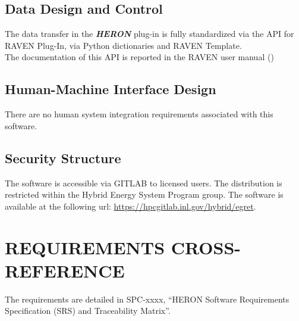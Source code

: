 \subsection{Data Design and Control}
The data transfer in the \textbf{\textit{HERON}}  plug-in is fully standardized via the API for RAVEN Plug-In, via
Python dictionaries and RAVEN Template.
\\The documentation of this  API is reported in the RAVEN user manual (\cite{RAVENuserManual})

\subsection{Human-Machine Interface Design} 
 There are no human system integration requirements associated with this software.

 \subsection{Security Structure} 


The software is accessible via GITLAB to licensed users. The distribution is restricted within the Hybrid Energy System Program group.
The software is available at the following url: \url{https://hpcgitlab.inl.gov/hybrid/egret}.

 \section{REQUIREMENTS CROSS-REFERENCE} 
The requirements are detailed in SPC-xxxx, ``HERON Software Requirements Specification (SRS) and Traceability Matrix''.